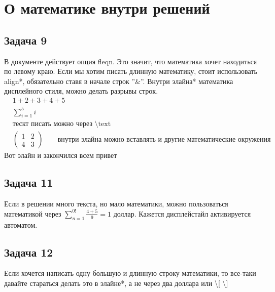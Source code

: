 \documentclass[a4paper, fleqn]{article}
\begin{document}
    \section*{О математике внутри решений}
    
    \subsection*{Задача 9}
    В документе действует опция fleqn. Это значит, что математика хочет находиться по левому краю.
    Если мы хотим писать длинную математику, стоит использовать align*, обязательно ставя в начале строк ''\&''.
    Внутри элайна* математика дисплейного стиля, можно делать разрывы строк.
    \begin{align*}
        & 1 + 2 + 3 + 4 + 5 \\
        & \sum_{i=1}^5 i \\
        & \text{тескт писать можно через \textbackslash text} \\
        & \begin{pmatrix}
            1 & 2 \\
            4 & 3
        \end{pmatrix} \;\;\;\;\;\; \text{ внутри элайна можно вставлять и другие математические окружения}
    \end{align*}
    Вот элайн и закончился всем привет

    
    \subsection*{Задача 11}
    Если в решении много текста, но мало математики, можно пользоваться математикой через 
    $\sum_{n=1}^{0!} \frac{4 + 5}{9} = 1$
    доллар. Кажется дисплейстайл активируется автоматом. 

    \subsection*{Задача 12}
    Если хочется написать одну большую и длинную строку математики, то все-таки давайте стараться делать это в
    элайне*, а не через два доллара или \textbackslash[ \textbackslash] 
\end{document}
